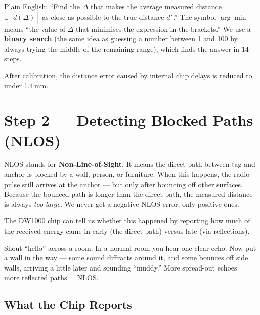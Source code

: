 \documentclass[11pt,a4paper]{article}
\begin{document}
Plain English: ``Find the $\Delta$ that makes the average measured distance $\mathbb{E}[\hat{d}(\Delta)]$ as close as possible to the true distance $d^\star$.'' The symbol $\arg\min$ means ``the value of $\Delta$ that minimises the expression in the brackets.'' We use a \textbf{binary search} (the same idea as guessing a number between 1 and 100 by always trying the middle of the remaining range), which finds the answer in 14 steps.

\begin{takeaway}
After calibration, the distance error caused by internal chip delays is reduced to under 1.4\,mm.
\end{takeaway}

\section{Step 2 --- Detecting Blocked Paths (NLOS)}
\label{sec:nlos}

\begin{plain}
NLOS stands for \textbf{Non-Line-of-Sight}. It means the direct path between tag and anchor is blocked by a wall, person, or furniture. When this happens, the radio pulse still arrives at the anchor --- but only after bouncing off other surfaces. Because the bounced path is longer than the direct path, the measured distance is always \emph{too large}. We never get a negative NLOS error, only positive ones.

The DW1000 chip can tell us whether this happened by reporting how much of the received energy came in early (the direct path) versus late (via reflections).
\end{plain}

\begin{analogy}
Shout ``hello'' across a room. In a normal room you hear one clear echo. Now put a wall in the way --- some sound diffracts around it, and some bounces off side walls, arriving a little later and sounding ``muddy.'' More spread-out echoes = more reflected paths = NLOS.
\end{analogy}

\subsection{What the Chip Reports}
\end{document}
